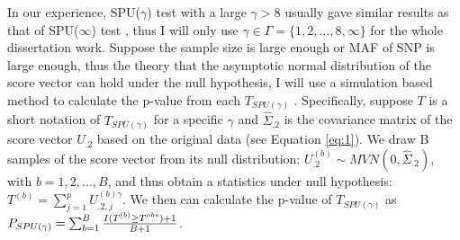 \documentclass[12pt]{article}
\begin{document}
%

In our experience, SPU($\gamma$) test with a large $\gamma > 8$ usually gave similar results as that of SPU($\infty$) test \cite{pan2014powerful}, thus I will only use $\gamma \in \Gamma = \{1,2,\ldots,8,\infty \} $ for the whole dissertation work. Suppose the sample size is large enough or MAF of SNP is large enough, thus the theory that the asymptotic normal distribution of the score vector can hold under the null hypothesis, I will use a simulation based method to calculate the p-value from each $T_{ SPU(\gamma) }$ \cite{Lin2005,Seaman2005}. Specifically, suppose $T$ is a short notation of $T_{ SPU(\gamma) }$ for a specific $\gamma$ and $\hat{\Sigma}_{.2}$ is the covariance matrix of the score vector $U_{.2}$ based on the original data (see Equation \ref{eq:1}). We draw B samples of the score vector from its null distribution: $U_{.2}^{ (b) } \sim MVN \left( 0, \hat{\Sigma}_{.2} \right)$, with $b = 1,2,\ldots,B$, and thus obtain a statistics under null hypothesis: $T ^ {(b)} = \sum_{j=1}^p U^{ (b)\gamma }_{.2, j} $. We then can calculate the p-value of $T_{ SPU(\gamma) }$ as $P_{ SPU(\gamma) } = \sum_{b=1}^B { I(T^{(b)} \geq T ^ {obs} ) + 1  \over B + 1 } $. 
\end{document}
